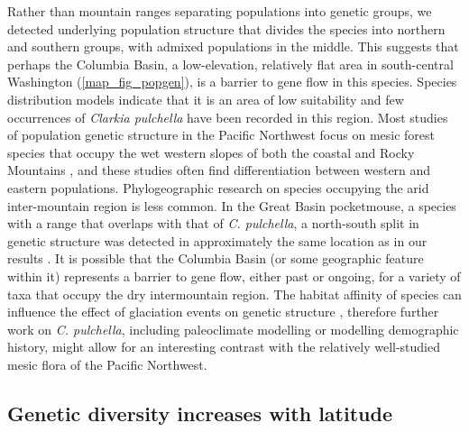 \documentclass{article}
\begin{document}
Rather than mountain ranges separating populations into genetic groups, we detected underlying population structure that divides the species into northern and southern groups, with admixed populations in the middle. This suggests that perhaps the Columbia Basin, a low-elevation, relatively flat area in south-central Washington (\autoref{map_fig_popgen}), is a barrier to gene flow in this species. Species distribution models indicate that it is an area of low suitability \citep{bontrager2016effects} and few occurrences of \textit{Clarkia pulchella} have been recorded in this region. Most studies of population genetic structure in the Pacific Northwest focus on mesic forest species that occupy the wet western slopes of both the coastal and Rocky Mountains \citep{shafer2010glaciers}, and these studies often find differentiation between western and eastern populations. Phylogeographic research on species occupying the arid inter-mountain region is less common. In the Great Basin pocketmouse, a species with a range that overlaps with that of \textit{C. pulchella}, a north-south split in genetic structure was detected in approximately the same location as in our results \citep{riddle2014cryptic}. It is possible that the Columbia Basin (or some geographic feature within it) represents a barrier to gene flow, either past or ongoing, for a variety of taxa that occupy the dry intermountain region. The habitat affinity of species can influence the effect of glaciation events on genetic structure \citep{massatti2014microhabitat}, therefore further work on \textit{C. pulchella}, including paleoclimate modelling or modelling demographic history, might allow for an interesting contrast with the relatively well-studied mesic flora of the Pacific Northwest. 

\subsection*{Genetic diversity increases with latitude}
\end{document}

